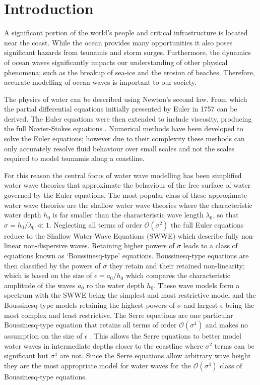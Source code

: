 \chapter{Introduction}
\label{chp:Introduction}

A significant portion of the world's people and critical infrastructure is located near the coast. While the ocean provides many opportunities it also poses significant hazards from tsunamis and storm surges. Furthermore, the dynamics of ocean waves significantly impacts our understanding of other physical phenomena; such as the breakup of sea-ice and the erosion of beaches. Therefore, accurate modelling of ocean waves is important to our society. 

The physics of water can be described using Newton's second law. From which the partial differential equations initially presented by Euler in 1757 \cite{Euler-1755-274} can be derived. The Euler equations were then extended to include viscosity, producing the full Navier-Stokes equations \cite{navier1823,stokes1845gg}. Numerical methods \cite{Chorin-1967-928,Taylor-Hood-1973-73,Bassi-1997-267} have been developed to solve the Euler equations; however due to their complexity these methods can only accurately resolve fluid behaviour over small scales and not the scales required to model tsunamis along a coastline. 

For this reason the central focus of water wave modelling has been simplified water wave theories that approximate the behaviour of the free surface of water governed by the Euler equations. The most popular class of these approximate water wave theories are the shallow water wave theories where the characteristic water depth $h_0$ is far smaller than the characteristic wave length $\lambda_0$, so that $\sigma = h_0 / \lambda_0 \ll 1$. Neglecting all terms of order $\mathcal{O}\left(\sigma ^2\right)$ the full Euler equations reduce to the Shallow Water Wave Equations (SWWE) \cite{Bonneton-Lannes-2009-16601} which describe fully non-linear non-dispersive waves. Retaining higher powers of $\sigma$ leads to a class of equations known as `Boussinesq-type' equations. Boussinesq-type equations are then classified by the powers of $\sigma$ they retain and their retained non-linearity; which is based on the size of $\epsilon= a_0 / h_0$ which compares the characteristic amplitude of the waves $a_0$ ro the water depth $h_0$. These wave models form a spectrum with the SWWE being the simplest and most restrictive model and the Boussinesq-type models retaining the highest powers of $\sigma$ and largest $\epsilon$ being the most complex and least restrictive. The Serre equations are one particular Boussinesq-type equation that retains all terms of order $\mathcal{O}\left(\sigma ^4\right)$ and makes no assumption on the size of $\epsilon$ \cite{Bonneton-Lannes-2009-16601}. This allows the Serre equations to better model water waves in intermediate depths closer to the coastline where $\sigma^2$ terms can be significant but $\sigma^4$ are not. Since the Serre equations allow arbitrary wave height they are the most appropriate model for water waves for the $\mathcal{O}\left(\sigma ^4\right)$ class of Boussinesq-type equations. 

